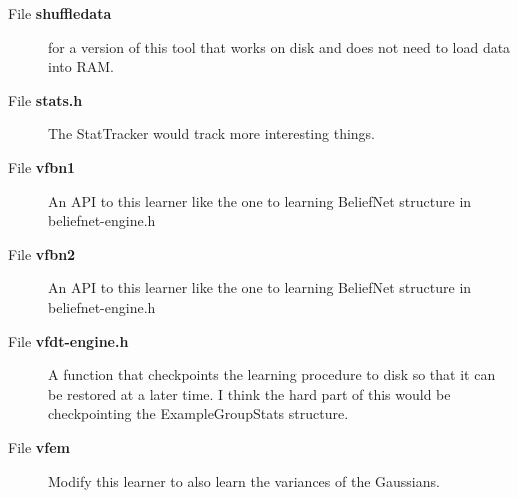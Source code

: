 \label{_wish000019}
 \begin{description}
\item[File {\bf shuffledata} ]for a version of this tool that works on disk and does not need to load data into RAM. \end{description}


\label{_wish000006}
 \begin{description}
\item[File {\bf stats.h} ]The Stat\-Tracker would track more interesting things. \end{description}


\label{_wish000013}
 \begin{description}
\item[File {\bf vfbn1} ]An API to this learner like the one to learning Belief\-Net structure in beliefnet-engine.h \end{description}


\label{_wish000014}
 \begin{description}
\item[File {\bf vfbn2} ]An API to this learner like the one to learning Belief\-Net structure in beliefnet-engine.h \end{description}


\label{_wish000007}
 \begin{description}
\item[File {\bf vfdt-engine.h} ]A function that checkpoints the learning procedure to disk so that it can be restored at a later time. I think the hard part of this would be checkpointing the Example\-Group\-Stats structure. \end{description}


\label{_wish000011}
 \begin{description}
\item[File {\bf vfem} ]Modify this learner to also learn the variances of the Gaussians. \end{description}
